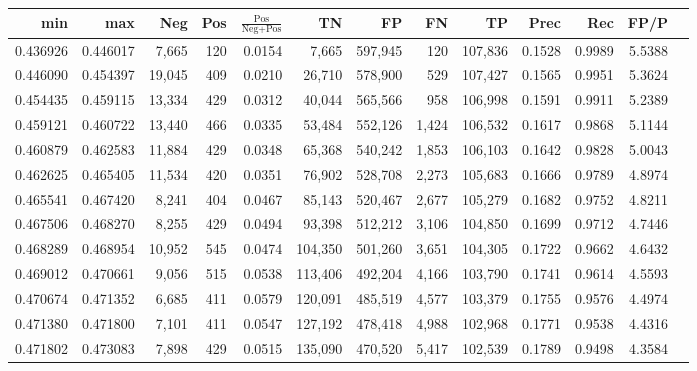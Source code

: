 \begin{tabular}{rrrrrrrrrrrrr}
\toprule
     min &      max &    Neg &   Pos & $\frac{\text{Pos}}{\text{Neg}+\text{Pos}}$ &      TN &      FP &      FN &      TP &   Prec &    Rec &   FP/P \\
\midrule
0.436926 & 0.446017 &  7,665 &   120 &                                     0.0154 &   7,665 & 597,945 &     120 & 107,836 & 0.1528 & 0.9989 & 5.5388 \\
0.446090 & 0.454397 & 19,045 &   409 &                                     0.0210 &  26,710 & 578,900 &     529 & 107,427 & 0.1565 & 0.9951 & 5.3624 \\
0.454435 & 0.459115 & 13,334 &   429 &                                     0.0312 &  40,044 & 565,566 &     958 & 106,998 & 0.1591 & 0.9911 & 5.2389 \\
0.459121 & 0.460722 & 13,440 &   466 &                                     0.0335 &  53,484 & 552,126 &   1,424 & 106,532 & 0.1617 & 0.9868 & 5.1144 \\
0.460879 & 0.462583 & 11,884 &   429 &                                     0.0348 &  65,368 & 540,242 &   1,853 & 106,103 & 0.1642 & 0.9828 & 5.0043 \\
0.462625 & 0.465405 & 11,534 &   420 &                                     0.0351 &  76,902 & 528,708 &   2,273 & 105,683 & 0.1666 & 0.9789 & 4.8974 \\
0.465541 & 0.467420 &  8,241 &   404 &                                     0.0467 &  85,143 & 520,467 &   2,677 & 105,279 & 0.1682 & 0.9752 & 4.8211 \\
0.467506 & 0.468270 &  8,255 &   429 &                                     0.0494 &  93,398 & 512,212 &   3,106 & 104,850 & 0.1699 & 0.9712 & 4.7446 \\
0.468289 & 0.468954 & 10,952 &   545 &                                     0.0474 & 104,350 & 501,260 &   3,651 & 104,305 & 0.1722 & 0.9662 & 4.6432 \\
0.469012 & 0.470661 &  9,056 &   515 &                                     0.0538 & 113,406 & 492,204 &   4,166 & 103,790 & 0.1741 & 0.9614 & 4.5593 \\
0.470674 & 0.471352 &  6,685 &   411 &                                     0.0579 & 120,091 & 485,519 &   4,577 & 103,379 & 0.1755 & 0.9576 & 4.4974 \\
0.471380 & 0.471800 &  7,101 &   411 &                                     0.0547 & 127,192 & 478,418 &   4,988 & 102,968 & 0.1771 & 0.9538 & 4.4316 \\
0.471802 & 0.473083 &  7,898 &   429 &                                     0.0515 & 135,090 & 470,520 &   5,417 & 102,539 & 0.1789 & 0.9498 & 4.3584 \\

\end{tabular}
